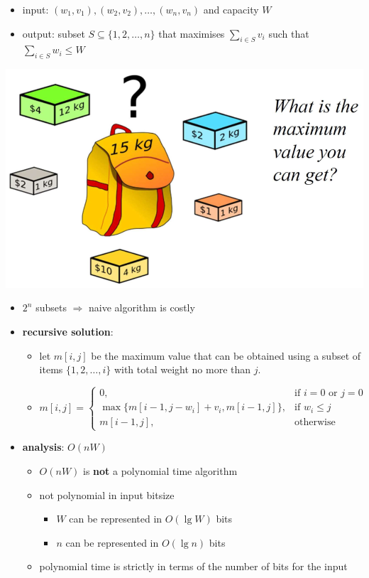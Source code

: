 \documentclass[10pt, landscape]{article}
\begin{document}
\begin{multicols*}{4}
  \begin{itemize}
    \item input: $(w_1, v_1), (w_2, v_2), \dots, (w_n, v_n) $ and capacity $W$
    \item output: subset $S \subseteq \{ 1, 2, \dots, n \}$ that maximises $\sum_{i \in S}v_i$ such that $\sum_{i \in S} w_i \leq W$
  \end{itemize}

  \begin{tightcenter}
    \includegraphics[width=0.7\linewidth]{cs3230-knapsack-problem.png} 
  \end{tightcenter}

  \begin{itemize}
    \item $2^n$ subsets $\Rightarrow$ naive algorithm is costly 
    \item \textbf{recursive solution}:
      \begin{itemize}
        \item let $m[i, j]$ be the maximum value that can be obtained using a subset of items $\{1, 2, \dots, i\}$ 
          with total weight no more than $j$.
        \item $m[i, j] = \begin{cases} 0, & \text{if $i=0$ or $j=0$} \\ \max\{ {\scriptstyle m[i-1, j-w_i] + v_i, m[i-1, j] }\}, & \text{if $w_i \leq j$} \\ m[i-1, j], & \text{otherwise} \end{cases} $
      \end{itemize}
    \item \textbf{analysis}: $O(nW)$
      \begin{itemize}
        \item \attention $O(nW)$ is \textbf{not} a polynomial time algorithm
        \item not polynomial in input bitsize 
          \begin{itemize}
            \item $W$ can be represented in $O(\lg W)$ bits
            \item $n$ can be represented in $O(\lg n)$ bits
          \end{itemize}
        \item polynomial time is strictly in terms of the number of bits for the input
      \end{itemize}
  \end{itemize}


\end{multicols*}
\end{document}
